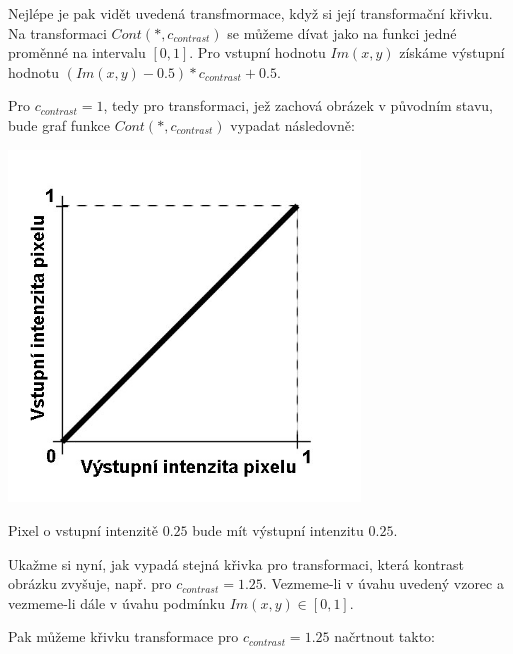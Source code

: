 Nejlépe je pak vidět uvedená transfmormace, když si její transformační křivku. Na transformaci $ Cont(*,c_{contrast}) $ se můžeme dívat jako na funkci jedné proměnné na intervalu $[0,1]$. Pro vstupní hodnotu $ Im(x,y) $ získáme výstupní hodnotu $ (Im(x,y) - 0.5)*c_{contrast} + 0.5 $.

Pro $ c_{contrast}=1 $, tedy pro transformaci, jež zachová obrázek v původním stavu, bude graf funkce $ Cont(*,c_{contrast}) $ vypadat následovně:

\begin{center}
\includegraphics[width=0.7\textwidth,height=0.7\textwidth]{Text/IMG/Kontrast_Identita.jpg}
\end{center}

Pixel o vstupní intenzitě $0.25$ bude mít výstupní intenzitu $0.25$.

Ukažme si nyní, jak vypadá stejná křivka pro transformaci, která kontrast obrázku zvyšuje, např. pro $ c_{contrast}=1.25 $.
Vezmeme-li v úvahu uvedený vzorec a vezmeme-li dále v úvahu podmínku $ Im(x,y) \in [0,1] $.

Pak můžeme křivku transformace pro $ c_{contrast}=1.25 $ načrtnout takto:



